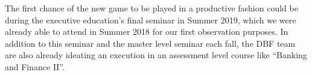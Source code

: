 The first chance of the new game to be played in a productive fashion could be during the executive education's final seminar in Summer 2019, which we were already able to attend in Summer 2018 for our first observation purposes. In addition to this seminar and the master level seminar each fall, the DBF team are also already ideating an execution in an assessment level course like ``Banking and Finance II''.
